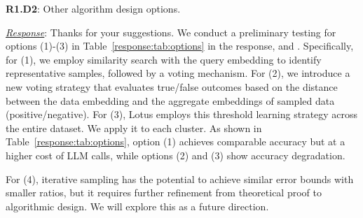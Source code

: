 \documentclass[sigconf]{acmart}
\begin{document}

{\noindent \textbf{R1.D2}}: Other algorithm design options. 



{\noindent \underline{\sl Response}:}
Thanks for your suggestions. 
We conduct a preliminary testing for options (1)-(3) in Table~\ref{response:tab:options} in the response, and .
 Specifically, for (1), we employ similarity search with the query embedding to identify representative samples, followed by a voting mechanism. 
 For (2), we introduce a new voting strategy that evaluates true/false outcomes based on the distance between the data embedding and the aggregate embeddings of sampled data (positive/negative). 
 For (3), Lotus employs this threshold learning strategy across the entire dataset. We apply it to each cluster.  As shown in Table~\ref{response:tab:options}, option (1) achieves comparable accuracy but at a higher cost of LLM calls, while options (2) and (3) show accuracy degradation.
 
 For (4), iterative sampling has the potential to achieve similar error bounds with smaller ratios, but it requires further refinement from theoretical proof to algorithmic design. 
 We will explore this as a future direction. 
\end{document}
